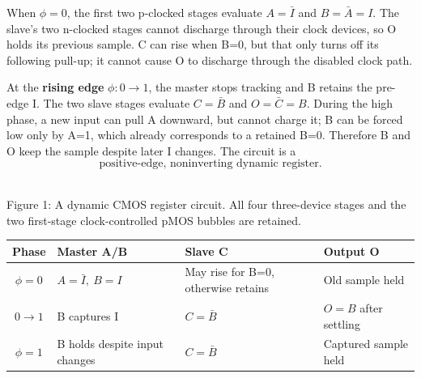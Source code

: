 \documentclass[10pt]{article}
\newcommand{\mos}[4]{\begin{scope}[shift={(#1,#2)}]
\draw(0,.24)--(0,-.24);\draw(0,.2)--(.25,.2)--(.25,.5);\draw(0,-.2)--(.25,-.2)--(.25,-.5);
\draw(-.16,.23)--(-.16,-.23);
\ifnum#4=1\draw(-.26,0)circle(.06);\draw(-.75,0)--(-.32,0);\else\draw(-.75,0)--(-.16,0);\fi
\node[anchor=east,font=\scriptsize]at(-.76,0){$#3$};\end{scope}}
\newcommand{\gnd}[2]{\draw(#1,#2)--(#1,{#2-.12});\draw({#1-.17},{#2-.12})--({#1+.17},{#2-.12});\draw({#1-.11},{#2-.2})--({#1+.11},{#2-.2});}
\newcommand{\rail}[3]{\draw(#1,#2)--(#1,{#2+.14});\node[above,font=\scriptsize]at(#1,{#2+.14}){$#3$};}
\begin{document}
When $\phi=0$, the first two p-clocked stages evaluate $A=\bar I$ and $B=\bar A=I$. The slave's two n-clocked stages cannot discharge through their clock devices, so O holds its previous sample. C can rise when B=0, but that only turns off its following pull-up; it cannot cause O to discharge through the disabled clock path.

At the \textbf{rising edge} $\phi:0\to1$, the master stops tracking and B retains the pre-edge I. The two slave stages evaluate $C=\bar B$ and $O=\bar C=B$. During the high phase, a new input can pull A downward, but cannot charge it; B can be forced low only by A=1, which already corresponds to a retained B=0. Therefore B and O keep the sample despite later I changes. The circuit is a
\[\boxed{\text{positive-edge, noninverting dynamic register}.}\]
\begin{center}\\Figure 1: A dynamic CMOS register circuit. All four three-device stages and the two first-stage clock-controlled pMOS bubbles are retained.\end{center}
\begin{center}\begin{tabular}{c|lll}\toprule
Phase&Master A/B&Slave C&Output O\\\midrule
$\phi=0$&$A=\bar I,\ B=I$&May rise for B=0, otherwise retains&Old sample held\\
$0\to1$&B captures I&$C=\bar B$&$O=B$ after settling\\
$\phi=1$&B holds despite input changes&$C=\bar B$&Captured sample held\\\bottomrule
\end{tabular}\end{center}
\end{document}

